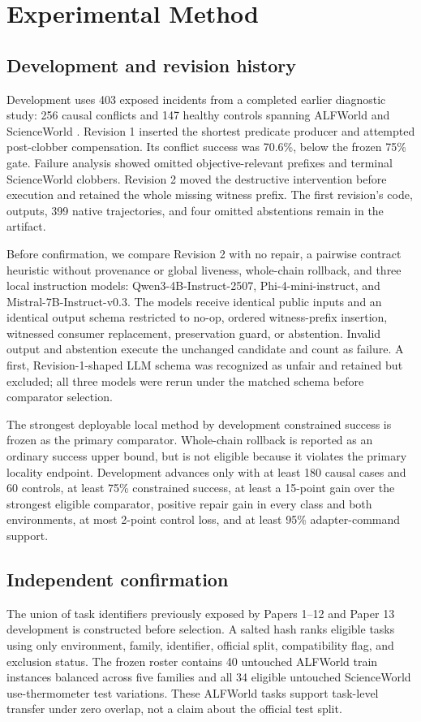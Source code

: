 \documentclass[10pt]{article}
\begin{document}
\section{Experimental Method}

\subsection{Development and revision history}
Development uses 403 exposed incidents from a completed earlier diagnostic study:
256 causal conflicts and 147 healthy controls spanning ALFWorld and ScienceWorld
\citep{shridhar2021alfworld,wang2022scienceworld}. Revision 1 inserted the shortest
predicate producer and attempted post-clobber compensation. Its conflict success
was 70.6\%, below the frozen 75\% gate. Failure analysis showed omitted
objective-relevant prefixes and terminal ScienceWorld clobbers. Revision 2 moved
the destructive intervention before execution and retained the whole missing
witness prefix. The first revision's code, outputs, 399 native trajectories, and
four omitted abstentions remain in the artifact.

Before confirmation, we compare Revision 2 with no repair, a pairwise contract
heuristic without provenance or global liveness, whole-chain rollback, and three
local instruction models: Qwen3-4B-Instruct-2507, Phi-4-mini-instruct, and
Mistral-7B-Instruct-v0.3. The models receive identical public inputs and an
identical output schema restricted to no-op, ordered witness-prefix insertion,
witnessed consumer replacement, preservation guard, or abstention. Invalid output
and abstention execute the unchanged candidate and count as failure. A first,
Revision-1-shaped LLM schema was recognized as unfair and retained but excluded;
all three models were rerun under the matched schema before comparator selection.

The strongest deployable local method by development constrained success is
frozen as the primary comparator. Whole-chain rollback is reported as an ordinary
success upper bound, but is not eligible because it violates the primary locality
endpoint. Development advances only with at least 180 causal cases and 60
controls, at least 75\% constrained success, at least a 15-point gain over the
strongest eligible comparator, positive repair gain in every class and both
environments, at most 2-point control loss, and at least 95\% adapter-command
support.

\subsection{Independent confirmation}
The union of task identifiers previously exposed by Papers 1--12 and Paper 13
development is constructed before selection. A salted hash ranks eligible tasks
using only environment, family, identifier, official split, compatibility flag,
and exclusion status. The frozen roster contains 40 untouched ALFWorld train
instances balanced across five families and all 34 eligible untouched
ScienceWorld use-thermometer test variations. These ALFWorld tasks support
task-level transfer under zero overlap, not a claim about the official test split.
\end{document}
